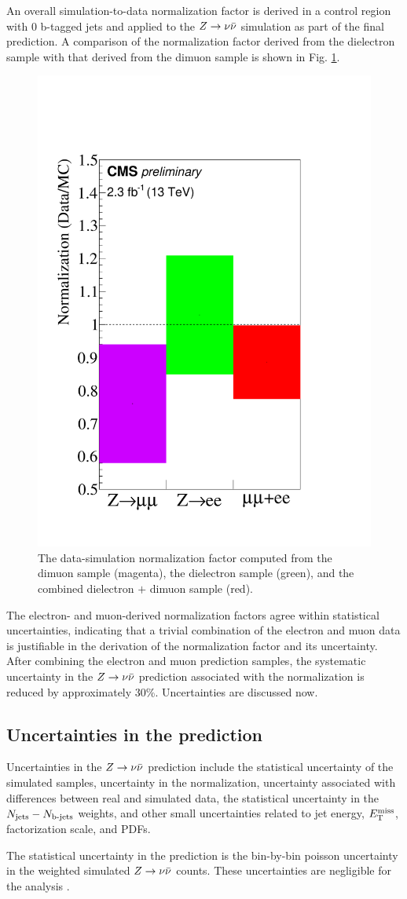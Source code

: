 An overall simulation-to-data normalization factor is derived in a control region with 0 b-tagged jets and applied to the $Z\rightarrow \nu\bar{\nu}$ simulation as part of the final prediction. A comparison of the normalization factor derived from the dielectron sample with that derived from the dimuon sample is shown in Fig. \ref{fig:ZInvNorm}.
\begin{figure}[tb!]
\centering
\includegraphics[width=0.4\linewidth]{figures/SusySearches/HadStop2015/NormFactors.pdf}
\caption{The data-simulation normalization factor computed from the dimuon sample (magenta), the dielectron sample (green), and the combined dielectron $+$ dimuon sample (red). }
\label{fig:ZInvNorm}
\end{figure}
\noindent
The electron- and muon-derived normalization factors agree within statistical uncertainties, indicating that a trivial combination of the electron and muon data is justifiable in the derivation of the normalization factor and its uncertainty. After combining the electron and muon prediction samples, the systematic uncertainty in the $Z\rightarrow \nu\bar{\nu}$ prediction associated with the normalization is reduced by approximately 30\%. Uncertainties are discussed now.

\FloatBarrier
\subsection{Uncertainties in the prediction}
Uncertainties in the $Z\rightarrow \nu\bar{\nu}$ prediction include the statistical uncertainty of the simulated samples, uncertainty in the normalization, uncertainty associated with differences between real and simulated data, the statistical uncertainty in the $N_{\rm jets}-N_{\text{b-jets}}$ weights, and other small uncertainties related to jet energy, $E_{\text{T}}^{\rm miss}$, factorization scale, and PDFs.  

The statistical uncertainty in the prediction is the bin-by-bin poisson uncertainty in the weighted simulated $Z\rightarrow \nu\bar{\nu}$ counts. These uncertainties are negligible for the analysis \cite{CMS:2016nhb}.

